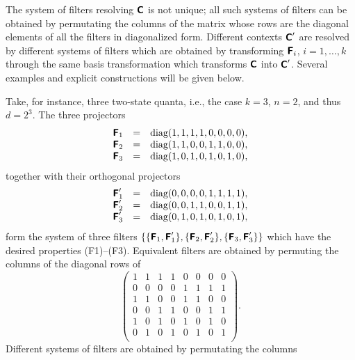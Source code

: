 The system of filters resolving $\textsf{\textbf{C}}$
is not unique;
all such systems of filters can be obtained by permutating
the columns of the matrix whose rows are
the diagonal elements of all the filters in diagonalized form.
Different contexts
$\textsf{\textbf{C}}'$
are resolved by different systems of filters which are obtained by transforming
$\textsf{\textbf{F}}_i$, $i=1,\ldots, k$ through
the same basis transformation which transforms
$\textsf{\textbf{C}}$
into
$\textsf{\textbf{C}}'$.
Several examples and explicit constructions will be given below.

Take, for instance, three two-state quanta, i.e.,
the case $k=3$, $n=2$, and thus $d=2^3$.
The three projectors
$$
\begin{array}{ccc}
\textsf{\textbf{F}}_1&=&\textrm{diag}(1,1,1,1,0,0,0,0),\\
\textsf{\textbf{F}}_2&=&\textrm{diag}(1,1,0,0,1,1,0,0),\\
\textsf{\textbf{F}}_3&=&\textrm{diag}(1,0,1,0,1,0,1,0),\\
\end{array}
$$
 together with their orthogonal projectors
$$
\begin{array}{ccc}
\textsf{\textbf{F}}_1'&=&\textrm{diag}(0,0,0,0,1,1,1,1), \\
\textsf{\textbf{F}}_2'&=&\textrm{diag}(0,0,1,1,0,0,1,1), \\
\textsf{\textbf{F}}_3'&=&\textrm{diag}(0,1,0,1,0,1,0,1),   \\
\end{array}
$$
form the system of three filters
$
\{
\{ \textsf{\textbf{F}}_1,\textsf{\textbf{F}}_1' \},
\{ \textsf{\textbf{F}}_2,\textsf{\textbf{F}}_2' \},
\{ \textsf{\textbf{F}}_3,\textsf{\textbf{F}}_3' \}
\}
$
which have the desired properties (F1)--(F3).
Equivalent filters are obtained by permuting the columns of the diagonal rows of
\begin{equation}
\left(
\begin{array}{cccccccc}
1&1&1&1&0&0&0&0\\
0&0&0&0&1&1&1&1\\
\hline
1&1&0&0&1&1&0&0\\
0&0&1&1&0&0&1&1\\
\hline
1&0&1&0&1&0&1&0\\
0&1&0&1&0&1&0&1\\
\end{array}
\right).
\label{2005-ko-e78}
\end{equation}
Different systems of filters are obtained by permutating the columns
